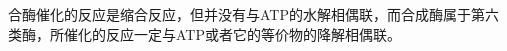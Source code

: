 
\begin{tx}[：区分合酶和合成酶]

	合酶催化的反应是缩合反应，但并没有与ATP的水解相偶联，而合成酶属于第六类酶，所催化的反应一定与ATP或者它的等价物的降解相偶联。
\end{tx}

